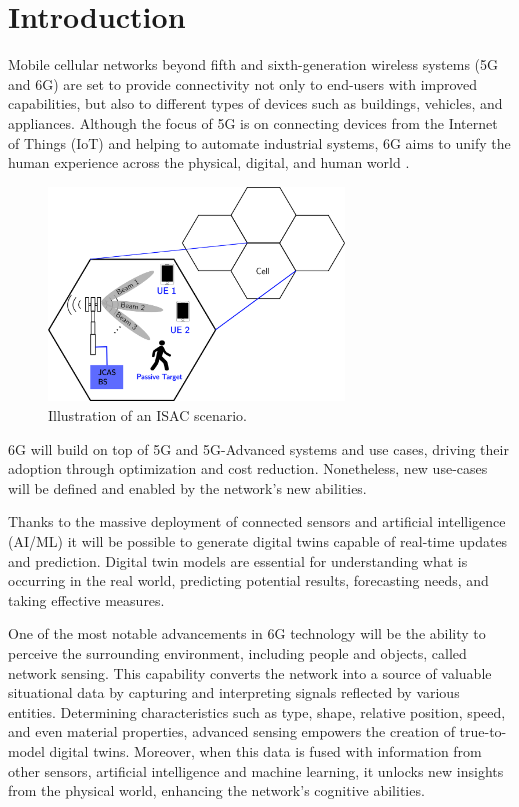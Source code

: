 \chapter{Introduction}
\label{chap_intro}

Mobile cellular networks beyond fifth and sixth-generation wireless systems (5G and 6G) are set to provide connectivity not only to end-users with improved capabilities, but also to different types of devices such as buildings, vehicles, and appliances.
Although the focus of 5G is on connecting devices from the Internet of Things (IoT) and helping to automate industrial systems, 6G aims to unify the human experience across the physical, digital, and human world \cite{6G-explained-NOKIA}.


\begin{figure}[H]
    \centering
    \includegraphics[width=0.7\textwidth]{Images/introduction/isac-scheme-1.png}
    \caption{Illustration of an ISAC scenario.}
    \label{fig:isac-scheme-1}
\end{figure}

6G will build on top of 5G and 5G-Advanced systems and use cases, driving their adoption through optimization and cost reduction. Nonetheless, new use-cases will be defined and enabled by the network's new abilities.

Thanks to the massive deployment of connected sensors and artificial intelligence (AI/ML) it will be possible to generate digital twins capable of real-time updates and prediction.  Digital twin models are essential for understanding what is occurring in the real world, predicting potential results, forecasting needs, and taking effective measures.

One of the most notable advancements in 6G technology will be the ability to perceive the surrounding environment, including people and objects, called network sensing. This capability converts the network into a source of valuable situational data by capturing and interpreting signals reflected by various entities. Determining characteristics such as type, shape, relative position, speed, and even material properties, advanced sensing empowers the creation of true-to-model digital twins. Moreover, when this data is fused with information from other sensors, artificial intelligence and machine learning, it unlocks new insights from the physical world, enhancing the network's cognitive abilities.

